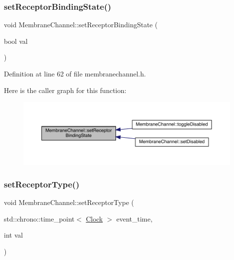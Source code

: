 \subsubsection{\texorpdfstring{set\+Receptor\+Binding\+State()}{setReceptorBindingState()}}
{\footnotesize\ttfamily void Membrane\+Channel\+::set\+Receptor\+Binding\+State (\begin{DoxyParamCaption}\item[{bool}]{val }\end{DoxyParamCaption})\hspace{0.3cm}{\ttfamily [inline]}}



Definition at line 62 of file membranechannel.\+h.

Here is the caller graph for this function\+:
\nopagebreak
\begin{figure}[H]
\begin{center}
\leavevmode
\includegraphics[width=350pt]{class_membrane_channel_a9f5c69ab1f4dce6113fceebaaa4f15f4_icgraph}
\end{center}
\end{figure}
\mbox{\label{class_membrane_channel_a7f40594845bb0aa6a03fd9c08a836d7e}} 
\subsubsection{\texorpdfstring{set\+Receptor\+Type()}{setReceptorType()}}
{\footnotesize\ttfamily void Membrane\+Channel\+::set\+Receptor\+Type (\begin{DoxyParamCaption}\item[{std\+::chrono\+::time\+\_\+point$<$ \hyperlink{universe_8h_a0ef8d951d1ca5ab3cfaf7ab4c7a6fd80}{Clock} $>$}]{event\+\_\+time,  }\item[{int}]{val }\end{DoxyParamCaption})\hspace{0.3cm}{\ttfamily [inline]}}



